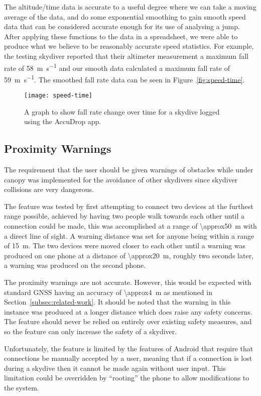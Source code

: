 The altitude/time data is accurate to a useful degree where we can take a moving average of the data, and do some exponential smoothing to gain smooth speed data that can be considered accurate enough for its use of analysing a jump. After applying these functions to the data in a spreadsheet, we were able to produce what we believe to be reasonably accurate speed statistics. For example, the testing skydiver reported that their altimeter measurement a maximum fall rate of \SI{58}{\metre\per\second} and our smooth data calculated a maximum fall rate of \SI{59}{\metre\per\second}. The smoothed fall rate data can be seen in Figure~\vref{fig:speed-time}.

\begin{figure}[ht]
  \centering
  \texttt{[image: speed-time]}
  \caption{A graph to show fall rate change over time for a skydive logged using the AccuDrop app.}\label{fig:speed-time}
\end{figure}

\subsection{Proximity Warnings}
The requirement that the user should be given warnings of obstacles while under canopy was implemented for the avoidance of other skydivers since skydiver collisions are very dangerous.

The feature was tested by first attempting to connect two devices at the furthest range possible, achieved by having two people walk towards each other until a connection could be made, this was accomplished at a range of \SI{\approx50}{\metre} with a direct line of sight. A warning distance was set for anyone being within a range of \SI{15}{\metre}. The two devices were moved closer to each other until a warning was produced on one phone at a distance of \SI{\approx20}{\metre}, roughly two seconds later, a warning was produced on the second phone.

The proximity warnings are not accurate. However, this would be expected with standard GNSS having an accuracy of \SI{\approx4}{\metre} as mentioned in Section~\ref{subsec:related-work}. It should be noted that the warning in this instance was produced at a longer distance which does raise any safety concerns. The feature should never be relied on entirely over existing safety measures, and so the feature can only increase the safety of a skydiver.

Unfortunately, the feature is limited by the features of Android that require that connections be manually accepted by a user, meaning that if a connection is lost during a skydive then it cannot be made again without user input. This limitation could be overridden by ``rooting'' the phone to allow modifications to the system.

